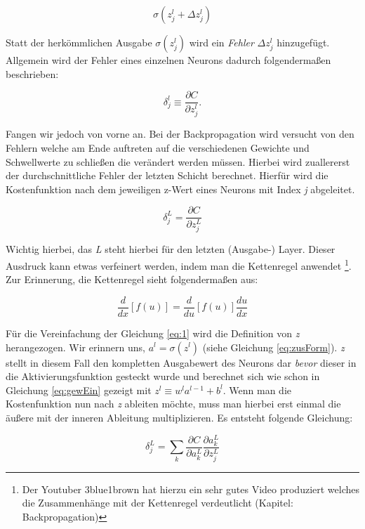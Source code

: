 \begin{equation}
\sigma(z^l_j+\Delta z^l_j)
\end{equation}

Statt der herkömmlichen Ausgabe $\sigma(z^l_j)$ wird ein \emph{Fehler} $\Delta z^l_j$ hinzugefügt. Allgemein wird der Fehler eines einzelnen Neurons dadurch folgendermaßen beschrieben: 

\begin{equation}
\delta^l_j \equiv \frac{\partial C}{\partial z^l_j}.
\end{equation}

Fangen wir jedoch von vorne an. Bei der Backpropagation wird versucht von den Fehlern welche am Ende auftreten auf die verschiedenen Gewichte und Schwellwerte zu schließen die verändert werden müssen. Hierbei wird zuallererst der durchschnittliche Fehler der letzten Schicht berechnet. Hierfür wird die Kostenfunktion nach dem jeweiligen z-Wert eines Neurons mit Index \emph{j} abgeleitet.

\begin{equation} \label{eq:1}
\delta^L_j = \frac{\partial C}{\partial z^L_j}
\end{equation}

Wichtig hierbei, das \emph{L} steht hierbei für den letzten (Ausgabe-) Layer. Dieser Ausdruck kann etwas verfeinert werden, indem man die Kettenregel anwendet \footnote{Der Youtuber 3blue1brown hat hierzu ein sehr gutes Video produziert welches die Zusammenhänge mit der Kettenregel verdeutlicht \cite{3b1b} (Kapitel: Backpropagation)}. Zur Erinnerung, die Kettenregel sieht folgendermaßen aus:  

\begin{equation}
\frac{d}{{dx}}\left[ {f\left( u \right)} \right] = \frac{d}{{du}}\left[ {f\left( u \right)} \right]\frac{{du}}{{dx}}
\end{equation}

Für die Vereinfachung der Gleichung \ref{eq:1} wird die Definition von \emph{z} herangezogen. Wir erinnern uns, $a^l = \sigma(z^l)$ (siehe Gleichung \ref{eq:zusForm}). \emph{z} stellt in diesem Fall den kompletten Ausgabewert des Neurons dar \emph{bevor} dieser in die Aktivierungsfunktion gesteckt wurde und berechnet sich wie schon in Gleichung \ref{eq:gewEin} gezeigt mit ${z^l \equiv w^l a^{l-1}+b^l}$. Wenn man die Kostenfunktion nun nach \emph{z} ableiten möchte, muss man hierbei erst einmal die äußere mit der inneren Ableitung multiplizieren. Es entsteht folgende Gleichung: 

\begin{equation}
\delta^L_j = \sum_k \frac{\partial C}{\partial a^L_k} \frac{\partial a^L_k}{\partial z^L_j}
\end{equation}

